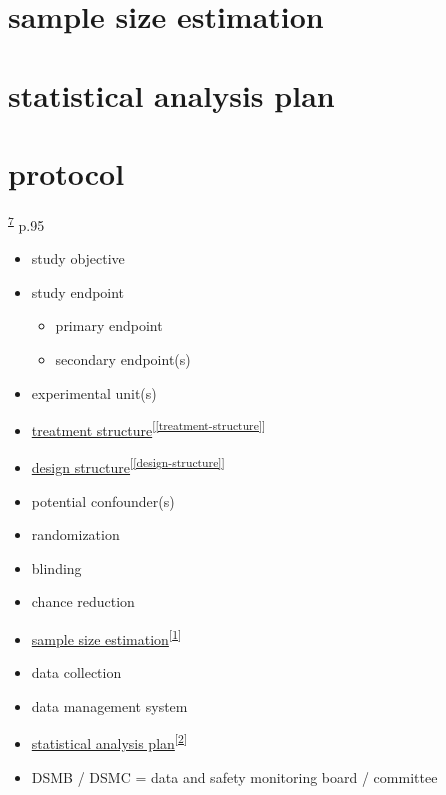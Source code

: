 \documentclass[
]{book}
\providecommand{\tightlist}{%
  \setlength{\itemsep}{0pt}\setlength{\parskip}{0pt}}
\theoremstyle{definition}
\theoremstyle{definition}
\theoremstyle{definition}
\theoremstyle{definition}
\theoremstyle{remark}
\begin{document}
\hypertarget{sample-size-estimation}{%
\section{sample size estimation}\label{sample-size-estimation}}

\hypertarget{statistical-analysis-plan}{%
\section{statistical analysis plan}\label{statistical-analysis-plan}}

\hypertarget{protocol}{%
\section{protocol}\label{protocol}}

\textsuperscript{\protect\hyperlink{ref-hu2022}{7}} p.95

\begin{itemize}
\tightlist
\item
  study objective
\item
  study endpoint

  \begin{itemize}
  \tightlist
  \item
    primary endpoint
  \item
    secondary endpoint(s)
  \end{itemize}
\item
  experimental unit(s)
\item
  \protect\hyperlink{treatment-structure}{treatment structure}\textsuperscript{{[}\ref{treatment-structure}{]}}
\item
  \protect\hyperlink{design-structure}{design structure}\textsuperscript{{[}\ref{design-structure}{]}}
\item
  potential confounder(s)
\item
  randomization
\item
  blinding
\item
  chance reduction
\item
  \protect\hyperlink{sample-size-estimation}{sample size estimation}\textsuperscript{{[}\ref{sample-size-estimation}{]}}
\item
  data collection
\item
  data management system
\item
  \protect\hyperlink{statistical-analysis-plan}{statistical analysis plan}\textsuperscript{{[}\ref{statistical-analysis-plan}{]}}
\item
  DSMB / DSMC = data and safety monitoring board / committee
\end{itemize}
\end{document}
